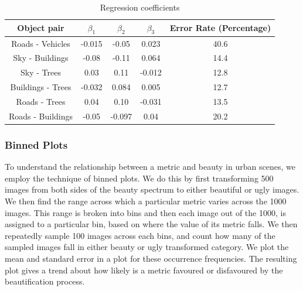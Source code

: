 \begin{table}[h]
	\centering
	\begin{tabular}{|c|c|c|c|c|}
		\hline
		\textbf{Object pair} & \textbf{$\beta_1$}  & \textbf{$\beta_2$} & \textbf{$\beta_3$}  & Error Rate (Percentage)\\
		\hline
		\hline
		Roads - Vehicles  & -0.015  & -0.05 & 0.023  & 40.6 \\
		\hline
		Sky - Buildings & -0.08 & -0.11 & 0.064 & 14.4 \\
		\hline
		Sky - Trees & 0.03 & 0.11 & -0.012 & 12.8  \\
		\hline
		Buildings - Trees & -0.032 & 0.084  & 0.005  & 12.7 \\
		\hline
		Roads - Trees & 0.04  & 0.10 &  -0.031  & 13.5  \\
		\hline
		Roads - Buildings & -0.05  & -0.097  &  0.04  & 20.2  \\
		\hline
	\end{tabular}
	\caption{Regression coefficients}
	\label{tab:regressioncoef}
\end{table}



\subsubsection{Binned Plots}
\label{sec:Binned}
To understand the relationship between a metric and beauty in urban scenes, we employ the technique of binned plots. We do this by first transforming 500 images from both sides of the beauty spectrum to either beautiful or ugly images. We then find the range across which a particular metric varies across the 1000 images. This range is broken into bins and then each image out of the 1000, is assigned to a particular bin, based on where the value of its metric falls. We then repeatedly sample 100 images across each bins, and count how many of the sampled images fall in either beauty or ugly transformed category. We plot the mean and standard error in a plot for these occurrence frequencies. The resulting plot gives a trend about how likely is a metric favoured or disfavoured by the beautification process.


